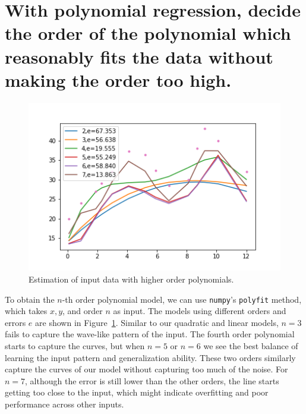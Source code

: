 \documentclass[11pt,margin=1in]{scrartcl}
\begin{document}
\section{With polynomial regression, decide the order of the polynomial
which reasonably fits the data without making the order too high.}
\begin{figure}
	\centering

	\includegraphics[scale=0.5]{p3}
	\caption{Estimation of input data with higher order polynomials.}
	\label{fig:orders}
\end{figure}

To obtain the $n$-th order polynomial model, we can use \texttt{numpy}'s \texttt{polyfit} method, which takes 
$x, y$, and order $n$ as input.
The models using different orders and errors $e$ are shown in Figure~\ref{fig:orders}.
Similar to our quadratic and linear models, $n=3$ fails to capture the wave-like pattern of the input.
The fourth order polynomial starts to capture the curves, but when $n=5$ or $n=6$ we see the best balance
of learning the input pattern and generalization ability.
These two orders similarly capture the curves of our model without capturing too much of the noise.
For $n=7$, although the error is still lower than the other orders, the line starts getting too close to the 
input, which might indicate overfitting and poor performance across other inputs.
\end{document}
